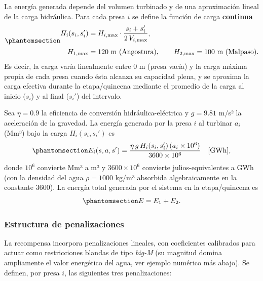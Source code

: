 \documentclass[
  spanish,
  letterpaper,
]{scrreprt}
\theoremstyle{definition}
\theoremstyle{remark}
\begin{document}
La energía generada depende del volumen turbinado y de una aproximación
lineal de la carga hidráulica. Para cada presa \(i\) se define la
función de carga \textbf{continua}
\begin{equation}\protect\phantomsection\label{eq-altura}{\begin{aligned}
H_i(s_i,s_i')
&= H_{i,\max}\cdot
\frac{s_i+s_i'}{2\,V_{i,\max}}, \\[4pt]
H_{1,\max} &= 120\ \text{m (Angostura)}, \qquad
H_{2,\max} = 100\ \text{m (Malpaso)}.
\end{aligned}}\end{equation} Es decir, la carga varía linealmente entre
\(0\) m (presa vacía) y la carga máxima propia de cada presa cuando ésta
alcanza su capacidad plena, y se aproxima la carga efectiva durante la
etapa/quincena mediante el promedio de la carga al inicio (\(s_i\)) y al
final (\(s_i'\)) del intervalo.

Sea \(\eta = 0.9\) la eficiencia de conversión hidráulica-eléctrica y
\(g = 9.81\) m/s² la aceleración de la gravedad. La energía generada por
la presa \(i\) al turbinar \(a_i\) (Mm³) bajo la carga \(H_i(s_i,s_i')\)
es
\begin{equation}\protect\phantomsection\label{eq-energia}{E_i(s,a,s') = \frac{\eta\, g\, H_i(s_i,s_i')\,(a_i\times 10^6)}{3600\times 10^6} \quad [\text{GWh}],}\end{equation}
donde \(10^6\) convierte Mm³ a m³ y \(3600\times10^6\) convierte
julios-equivalentes a GWh (con la densidad del agua \(\rho=1000\) kg/m³
absorbida algebraicamente en la constante \(3600\)). La energía total
generada por el sistema en la etapa/quincena es
\begin{equation}\protect\phantomsection\label{eq-energia-total}{E = E_1+E_2.}\end{equation}

\subsubsection{Estructura de
penalizaciones}\label{estructura-de-penalizaciones}

La recompensa incorpora penalizaciones lineales, con coeficientes
calibrados para actuar como restricciones blandas de tipo \emph{big-M}
(su magnitud domina ampliamente el valor energético del agua, ver
ejemplo numérico más abajo). Se definen, por presa \(i\), las siguientes
tres penalizaciones:
\end{document}
